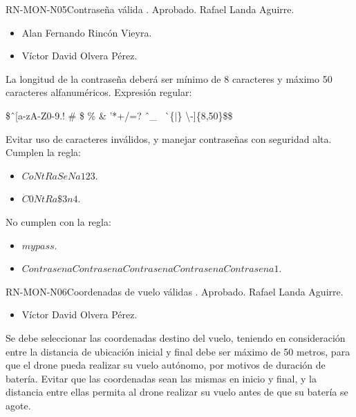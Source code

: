%
\begin{BusinessRule}{RN-MON-N05}{Contraseña válida}
	{\bcIntegridad}
	{\btEnabler}
	{\blControlling}
	.
	\BRItem[Estado] Aprobado.
	 Rafael Landa Aguirre.
	 \cdtEmpty
	\begin{itemize}
		\item Alan Fernando Rincón Vieyra.
		\item Víctor David Olvera Pérez.
	\end{itemize}
	\BRItem[Descripción] La longitud de la contraseña deberá ser mínimo de 8 
	caracteres y máximo 50 caracteres alfanuméricos.
	\BRItem[Sentencia] Expresión regular:
	\begin{center}
		\$\^ \ [a-zA-Z0-9.! \# \$ \% \& '*+/=? \^ \ \_ \ \` \ \{$|$\} 
		\textbackslash -]\{8,50\}\$\$
	\end{center}
	\BRItem[Motivación] Evitar uso de caracteres inválidos, y manejar 
	contraseñas con seguridad alta.
	 Cumplen la regla:
	\begin{itemize}
		\item $CoNtRaSeNa123$.
		\item $C0NtRa\$3n4$.
	\end{itemize}
	 No cumplen con la regla:
	\begin{itemize}
		\item $my pass$.
		\item $ContrasenaContrasenaContrasenaContrasenaContrasena1$.
	\end{itemize}
\end{BusinessRule}

%
\begin{BusinessRule}{RN-MON-N06}{Coordenadas de vuelo válidas}
	{\bcIntegridad}
	{\btEnabler}
	{\blControlling}
	.
	\BRItem[Estado] Aprobado.
	 Rafael Landa Aguirre.
	 \cdtEmpty
	\begin{itemize}
		\item Víctor David Olvera Pérez.
	\end{itemize}
	\BRItem[Descripción] Se debe seleccionar las coordenadas destino del 
	vuelo, teniendo en consideración entre la distancia de ubicación inicial 
	y final debe ser máximo de 50 metros, para que el drone pueda realizar 
	su vuelo autónomo, por motivos de duración de batería.
	\BRItem[Motivación] Evitar que las coordenadas sean las mismas en inicio 
	y final, y la distancia entre ellas permita al drone realizar su vuelo 
	antes de que su batería se agote.
\end{BusinessRule}



